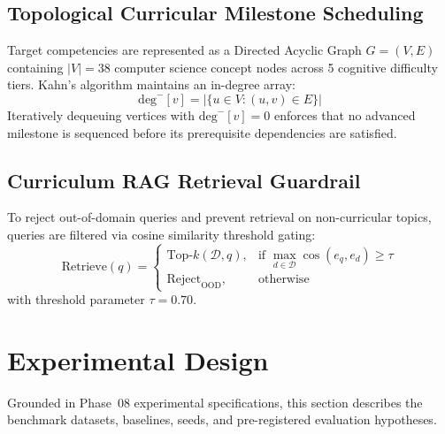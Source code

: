 \documentclass[conference]{IEEEtran}
\begin{document}
\subsection{Topological Curricular Milestone Scheduling}
Target competencies are represented as a Directed Acyclic Graph $G = (V, E)$ containing $|V| = 38$ computer science concept nodes across 5 cognitive difficulty tiers. Kahn's algorithm maintains an in-degree array:
\begin{equation}
\text{deg}^-[v] = |\{u \in V : (u, v) \in E\}|
\end{equation}
Iteratively dequeuing vertices with $\text{deg}^-[v] = 0$ enforces that no advanced milestone is sequenced before its prerequisite dependencies are satisfied.

\subsection{Curriculum RAG Retrieval Guardrail}
To reject out-of-domain queries and prevent retrieval on non-curricular topics, queries are filtered via cosine similarity threshold gating:
\begin{equation}
\text{Retrieve}(q) = \begin{cases} 
\text{Top-}k(\mathcal{D}, q), & \text{if } \max_{d \in \mathcal{D}} \cos(e_q, e_d) \ge \tau \\ 
\text{Reject}_{\text{OOD}}, & \text{otherwise} 
\end{cases}
\end{equation}
with threshold parameter $\tau = 0.70$.

\section{Experimental Design}

Grounded in Phase~08 experimental specifications, this section describes the benchmark datasets, baselines, seeds, and pre-registered evaluation hypotheses.
\end{document}
